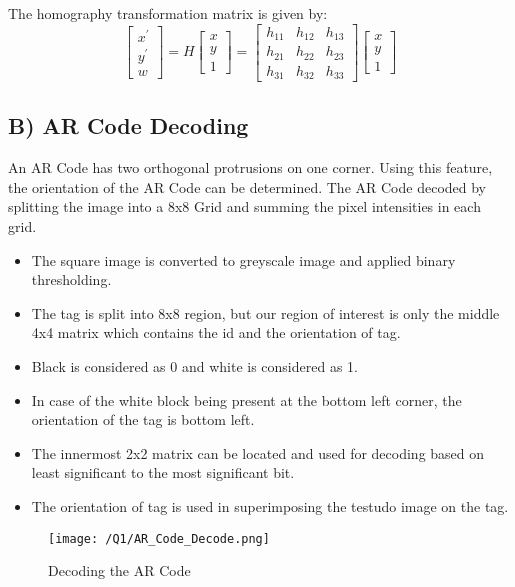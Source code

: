 \documentclass[a4paper, 10pt]{article}
\begin{document}
\begin{multicols}{2}
		The homography transformation matrix is given by:
		\[
		\begin{bmatrix}
		x^{'} \\
		y^{'} \\
		w
		\end{bmatrix} =
		H\begin{bmatrix}
		x \\
		y \\
		1
		\end{bmatrix} = 
		\begin{bmatrix}
		h_{11} & h_{12} & h_{13}\\
		h_{21} & h_{22} & h_{23}\\
		h_{31} & h_{32} & h_{33}
		\end{bmatrix}
		\begin{bmatrix}
		x \\
		y \\
		1
		\end{bmatrix}
		\]
		
		\subsection{B) AR Code Decoding}
		An AR Code has two orthogonal protrusions on one corner. Using this feature, the orientation of the AR Code can be determined. The AR Code decoded by splitting the image into a 8x8 Grid and summing the pixel intensities in each grid.
		\begin{itemize}
		 \item The square image is converted to greyscale image and applied binary thresholding.
		\item The tag is split into 8x8 region, but our region of interest is only the middle 4x4 matrix which contains the id and the orientation of tag.
		\item Black is considered as 0 and white is considered as 1.
		\item In case of the white block being present at the bottom left corner, the orientation of the tag is bottom left.
		\item The innermost 2x2 matrix can be located and used for decoding based on least significant to the most significant bit. 
		\item The orientation of tag is used in superimposing the testudo image on the tag.
		\end{itemize}
		
		\begin{figure}[H]
			\centering
			\texttt{[image: /Q1/AR\_Code\_Decode.png]}
			\caption{Decoding the AR Code}
			\label{fig:ARDecode}
		\end{figure}
		

\end{multicols}
\end{document}
